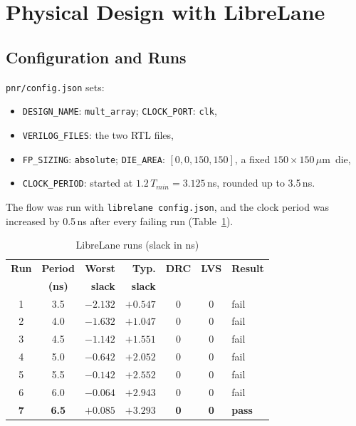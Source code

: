\documentclass[conference]{IEEEtran}
\newcommand{\um}{\,$\mu$m}
\begin{document}
\section{Physical Design with LibreLane}

\subsection{Configuration and Runs}
\texttt{pnr/config.json} sets:
\begin{itemize}
    \item \texttt{DESIGN\_NAME}: \texttt{mult\_array}; \texttt{CLOCK\_PORT}: \texttt{clk},
    \item \texttt{VERILOG\_FILES}: the two RTL files,
    \item \texttt{FP\_SIZING}: \texttt{absolute}; \texttt{DIE\_AREA}: $[0,0,150,150]$, a fixed $150\times150$\um\ die,
    \item \texttt{CLOCK\_PERIOD}: started at $1.2\,T_{min} = 3.125$\,ns, rounded up to 3.5\,ns.
\end{itemize}
The flow was run with \texttt{librelane config.json}, and the clock period was increased by 0.5\,ns after
every failing run (Table~\ref{tab:runs}).

\begin{table}[H]
\centering
\caption{LibreLane runs (slack in ns)}
\label{tab:runs}
\setlength{\tabcolsep}{4.5pt}
\begin{tabular}{ccrrccl}
\toprule
\textbf{Run} & \textbf{Period} & \textbf{Worst} & \textbf{Typ.} & \textbf{DRC} & \textbf{LVS} & \textbf{Result} \\
 & \textbf{(ns)} & \textbf{slack} & \textbf{slack} & & & \\
\midrule
1 & 3.5 & $-2.132$ & $+0.547$ & 0 & 0 & fail \\
2 & 4.0 & $-1.632$ & $+1.047$ & 0 & 0 & fail \\
3 & 4.5 & $-1.142$ & $+1.551$ & 0 & 0 & fail \\
4 & 5.0 & $-0.642$ & $+2.052$ & 0 & 0 & fail \\
5 & 5.5 & $-0.142$ & $+2.552$ & 0 & 0 & fail \\
6 & 6.0 & $-0.064$ & $+2.943$ & 0 & 0 & fail \\
\textbf{7} & \textbf{6.5} & $\mathbf{+0.085}$ & $\mathbf{+3.293}$ & \textbf{0} & \textbf{0} & \textbf{pass} \\
\bottomrule
\end{tabular}
\end{table}
\end{document}
